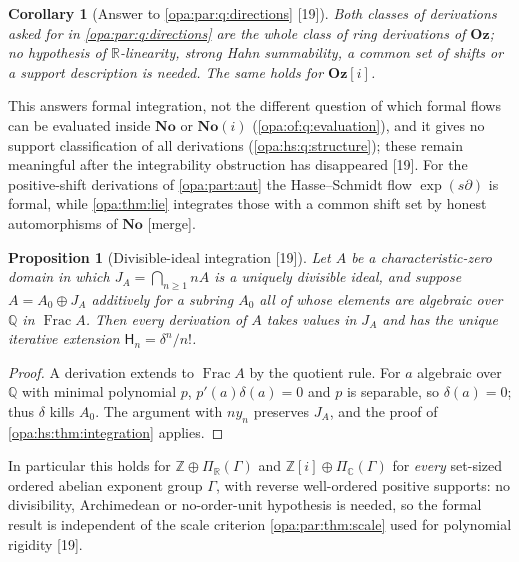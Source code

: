 \documentclass[11pt,oneside]{article}
\numberwithin{equation}{section}
\newtheorem{proposition}[proposition]{Proposition}
\newtheorem{corollary}[corollary]{Corollary}
\theoremstyle{definition}
\theoremstyle{remark}
\newcommand{\No}{\mathbf{No}}
\newcommand{\Oz}{\mathbf{Oz}}
\newcommand{\Og}{\mathbf{Oz}[i]}
\newcommand{\SC}{\mathbf{No}(i)}
\newcommand{\R}{\mathbb R}
\newcommand{\C}{\mathbb C}
\newcommand{\Q}{\mathbb Q}
\newcommand{\Z}{\mathbb Z}
\newcommand{\Frac}{\operatorname{Frac}}
\newcommand{\src}[1]{\textup{\textsf{\small[#1]}}}
\newcommand{\mergetag}{\textup{\textsf{\small[merge]}}}
\begin{document}
\begin{corollary}[Answer to \cref{opa:par:q:directions} \src{19}]\label{opa:hs:cor:question}
Both classes of derivations asked for in \cref{opa:par:q:directions} are the whole class of ring derivations of $\Oz$; no hypothesis of
$\R$-linearity, strong Hahn summability, a common set of shifts or a support description is needed. The same holds for $\Og$.
\end{corollary}

This answers formal integration, not the different question of which formal flows can be evaluated inside $\No$ or $\SC$
(\cref{opa:of:q:evaluation}), and it gives no support classification of all derivations (\cref{opa:hs:q:structure}); these remain meaningful
after the integrability obstruction has disappeared \src{19}. For the positive-shift derivations of \cref{opa:part:aut} the
Hasse--Schmidt flow $\exp(s\partial)$ is formal, while \cref{opa:thm:lie} integrates those with a common shift set by honest automorphisms of
$\No$ \mergetag.

\begin{proposition}[Divisible-ideal integration \src{19}]\label{opa:hs:prop:abstract}
Let $A$ be a characteristic-zero domain in which $J_A=\bigcap_{n\ge1}nA$ is a uniquely divisible ideal, and suppose $A=A_0\oplus J_A$
additively for a subring $A_0$ all of whose elements are algebraic over $\Q$ in $\Frac A$. Then every derivation of $A$ takes values in $J_A$
and has the unique iterative extension $\mathsf H_n=\delta^n/n!$.
\end{proposition}
\begin{proof}
A derivation extends to $\Frac A$ by the quotient rule. For $a$ algebraic over $\Q$ with minimal polynomial $p$, $p'(a)\delta(a)=0$ and $p$ is
separable, so $\delta(a)=0$; thus $\delta$ kills $A_0$. The argument with $ny_n$ preserves $J_A$, and the proof of
\cref{opa:hs:thm:integration} applies.
\end{proof}

In particular this holds for $\Z\oplus\Pi_\R(\Gamma)$ and $\Z[i]\oplus\Pi_\C(\Gamma)$ for \emph{every} set-sized ordered abelian exponent group
$\Gamma$, with reverse well-ordered positive supports: no divisibility, Archimedean or no-order-unit hypothesis is needed, so the formal result
is independent of the scale criterion \cref{opa:par:thm:scale} used for polynomial rigidity \src{19}.
\end{document}
